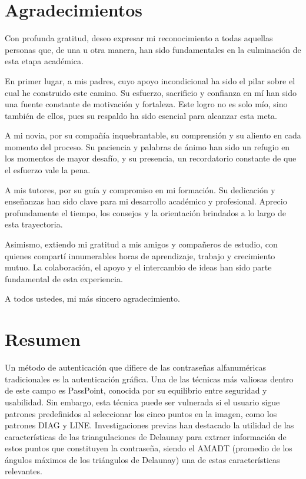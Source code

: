 \documentclass[12pt]{report}
\begin{document}
\chapter*{Agradecimientos}

Con profunda gratitud, deseo expresar mi reconocimiento a todas aquellas personas que, de una u otra manera, han sido fundamentales en la culminación de esta etapa académica.

En primer lugar, a mis padres, cuyo apoyo incondicional ha sido el pilar sobre el cual he construido este camino. Su esfuerzo, sacrificio y confianza en mí han sido una fuente constante de motivación y fortaleza. Este logro no es solo mío, sino también de ellos, pues su respaldo ha sido esencial para alcanzar esta meta.

A mi novia, por su compañía inquebrantable, su comprensión y su aliento en cada momento del proceso. Su paciencia y palabras de ánimo han sido un refugio en los momentos de mayor desafío, y su presencia, un recordatorio constante de que el esfuerzo vale la pena.

A mis tutores, por su guía y compromiso en mi formación. Su dedicación y enseñanzas han sido clave para mi desarrollo académico y profesional. Aprecio profundamente el tiempo, los consejos y la orientación brindados a lo largo de esta trayectoria.

Asimismo, extiendo mi gratitud a mis amigos y compañeros de estudio, con quienes compartí innumerables horas de aprendizaje, trabajo y crecimiento mutuo. La colaboración, el apoyo y el intercambio de ideas han sido parte fundamental de esta experiencia.

A todos ustedes, mi más sincero agradecimiento.


\chapter*{Resumen}
\hypertarget{Resumen}{}

	Un método de autenticación que difiere de las contraseñas alfanuméricas tradicionales es la autenticación gráfica. Una de las técnicas más valiosas dentro de este campo es PassPoint, conocida por su equilibrio entre seguridad y usabilidad. Sin embargo, esta técnica puede ser vulnerada si el usuario sigue patrones predefinidos al seleccionar los cinco puntos en la imagen, como los patrones DIAG y LINE. Investigaciones previas han destacado la utilidad de las características de las triangulaciones de Delaunay para extraer información de estos puntos que constituyen la contraseña, siendo el AMADT (promedio de los ángulos máximos de los triángulos de Delaunay) una de estas características relevantes.
	
\end{document}
